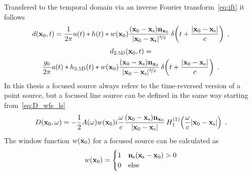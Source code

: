 Transfered to the temporal domain via an inverse Fourier transform~\eqref{eq:ift} it follows
%
\begin{equation}
    d(\x_0,t) = \frac{1}{2\pi} a(t) * h(t) * w(\x_0)
    \frac{(\x_0-\xs)\n_{\x_0}}{|\x_0-\xs|^{\nicefrac{3}{2}}}
    \deltafunc{t+\frac{|\x_0-\xs|}{c}} \qc
    \label{eq:d_wfs_fs}
\end{equation}
%
\begin{multline}
    d_\twohalfD(\x_0,t) = \\
    \frac{g_0}{2\pi} a(t) * h_\twohalfD(t) * w(\x_0)
    \frac{(\x_0-\xs)\n_{\x_0}}{|\x_0-\xs|^{\nicefrac{3}{2}}}
    \deltafunc{t+\frac{|\x_0-\xs|}{c}} \qp
    \label{eq:d_wfs_fs_25D}
\end{multline}
%
In this thesis a focused source always refers to the time-reversed
version of a point source, but a focused line source can be defined in the
same way starting from~\eqref{eq:D_wfs_ls}
%
\begin{equation}
    D(\x_0,\omega) = -\frac{1}{2}A(\omega) w(\x_0) i\omegac
    \frac{(\x_0-\xs)\n_{\x_0}}{|\x_0-\xs|}
    \H{1}{1}\left(\omegac|\x_0-\xs|\right) \qp
    \label{eq:D_wfs_ls_fs}
\end{equation}
%
The window function $w(\mathbf{x}_0)$ for a focused source can be
calculated as
%
\begin{equation}
    w(\x_0) = 
    \begin{cases}
        1 & \n_\text{s} (\xs-\x_0) > 0 \\
        0 & \text{else}
    \end{cases}
    \label{eq:w_fs}
\end{equation}
%


